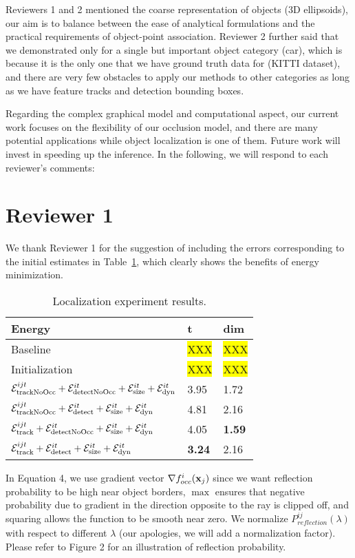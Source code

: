 \documentclass[10pt,twocolumn,letterpaper]{article}
\newcommand{\hili}[1]{\colorbox{yellow}{#1}}
\begin{document}
Reviewers 1 and 2 mentioned the coarse representation of objects (3D ellipsoids), our aim is to balance between the ease of analytical formulations and the practical requirements of object-point association. Reviewer 2 further said that we demonstrated only for a single but important object category (car), which is because it is the only one that we have ground truth data for (KITTI dataset), and there are very few obstacles to apply our methods to other categories as long as we have feature tracks and detection bounding boxes.

Regarding the complex graphical model and computational aspect, our current work focuses on the flexibility of our occlusion model, and there are many potential applications while object localization is one of them. Future work will invest in speeding up the inference. In the following, we will respond to each reviewer's comments:

\section{Reviewer 1}

We thank Reviewer 1 for the suggestion of including the errors corresponding to the initial estimates in Table~\ref{tab:localization}, which clearly shows the benefits of energy minimization.   

\begin{table}\centering\footnotesize
\begin{tabular}{|l|l|l|}
\hline
Energy & t & dim \\
\hline
\hline
Baseline & \hili{XXX} & \hili{XXX} \\
Initialization & \hili{XXX} & \hili{XXX} \\
$\mathcal{E}^{ijt}_{\text{trackNoOcc}} + \mathcal{E}^{it}_{\text{detectNoOcc}} +\mathcal{E}^{it}_{\text{size}}+\mathcal{E}^{it}_{\text{dyn}}$ 
& 3.95  & 1.72\\        
$\mathcal{E}^{ijt}_{\text{trackNoOcc}} + \mathcal{E}^{it}_{\text{detect}} +\mathcal{E}^{it}_{\text{size}}+\mathcal{E}^{it}_{\text{dyn}}$        
& 4.81  & 2.16\\        
$\mathcal{E}^{ijt}_{\text{track}} + \mathcal{E}^{it}_{\text{detectNoOcc}} +\mathcal{E}^{it}_{\text{size}}+\mathcal{E}^{it}_{\text{dyn}}$      
& 4.05  & {\bf 1.59}\\        
$\mathcal{E}^{ijt}_{\text{track}} + \mathcal{E}^{it}_{\text{detect}} +\mathcal{E}^{it}_{\text{size}}+\mathcal{E}^{it}_{\text{dyn}}$             
& {\bf 3.24}  & 2.16\\
\hline
\end{tabular}
\caption{Localization experiment results.}
\label{tab:localization}
\end{table}

In Equation 4, we use gradient vector $\nabla {f^i_{occ}}(\mathbf{x}_j)$ since we want reflection probability to be high near object borders, $\max$ ensures that negative probability due to gradient in the direction opposite to the ray is clipped off, and squaring allows the function to be smooth near zero. We normalize $P^{ij}_{\textit{reflection}}(\lambda)$  with respect to different $\lambda$ (our apologies, we will add a normalization factor). Please refer to Figure 2 for an illustration of reflection probability.
\end{document}
